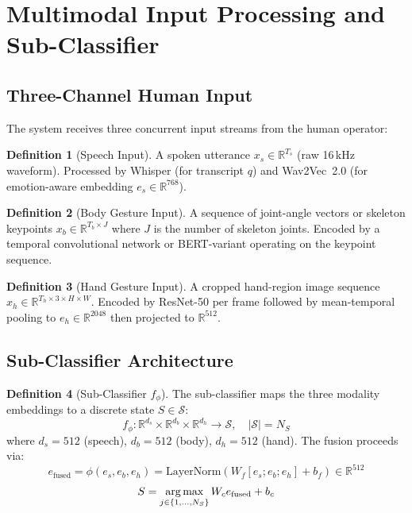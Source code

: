 \documentclass[12pt,a4paper]{article}
\theoremstyle{definition}
\newtheorem{definition}{Definition}[section]
\theoremstyle{plain}
\theoremstyle{remark}
\newcommand{\R}{\mathbb{R}}
\newcommand{\LN}{\mathrm{LayerNorm}}
\newcommand{\argmax}{\operatornamewithlimits{arg\,max}}
\begin{document}
\newpage
\section{Multimodal Input Processing and Sub-Classifier}
\label{sec:inputs}

\subsection{Three-Channel Human Input}
\label{sec:inputs_channels}

The system receives three concurrent input streams from the human operator:

\begin{definition}[Speech Input]
A spoken utterance $x_s \in \R^{T_s}$ (raw 16\,kHz waveform). Processed by Whisper (for transcript $q$) and Wav2Vec~2.0 (for emotion-aware embedding $e_s \in \R^{768}$).
\end{definition}

\begin{definition}[Body Gesture Input]
A sequence of joint-angle vectors or skeleton keypoints $x_b \in \R^{T_b \times J}$ where $J$ is the number of skeleton joints. Encoded by a temporal convolutional network or BERT-variant operating on the keypoint sequence.
\end{definition}

\begin{definition}[Hand Gesture Input]
A cropped hand-region image sequence $x_h \in \R^{T_h \times 3 \times H \times W}$. Encoded by ResNet-50 per frame followed by mean-temporal pooling to $e_h \in \R^{2048}$ then projected to $\R^{512}$.
\end{definition}

\subsection{Sub-Classifier Architecture}
\label{sec:subclassifier}

\begin{definition}[Sub-Classifier $f_\phi$]
The sub-classifier maps the three modality embeddings to a discrete state $S \in \mathcal{S}$:
\[
  f_\phi : \R^{d_s} \times \R^{d_b} \times \R^{d_h} \to \mathcal{S}, \quad |\mathcal{S}| = N_S
\]
where $d_s = 512$ (speech), $d_b = 512$ (body), $d_h = 512$ (hand). The fusion proceeds via:
\[
  e_{\text{fused}} = \phi(e_s, e_b, e_h) = \LN\!\left(W_f [e_s; e_b; e_h] + b_f\right) \in \R^{512}
\]
\[
  S = \argmax_{j \in \{1,\ldots,N_S\}} W_c e_{\text{fused}} + b_c
\]
\end{definition}
\end{document}
